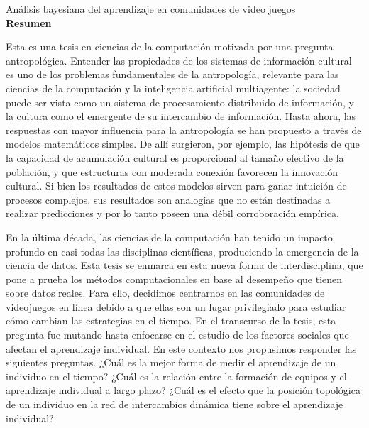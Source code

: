 \documentclass[a4paper,11pt]{book}
\theoremstyle{definition}
\newcommand{\TITULO}[0]{Análisis bayesiana del aprendizaje en comunidades de video juegos}
\begin{document}
\newpage

\begin{center}
\Large \TITULO \normalsize \\[0.5cm]

\textbf{Resumen}
\end{center}

\small

Esta es una tesis en ciencias de la computación motivada por una pregunta antropológica.
Entender las propiedades de los sistemas de información cultural es uno de los problemas fundamentales de la antropología, relevante para las ciencias de la computación y la inteligencia artificial multiagente: la sociedad puede ser vista como un sistema de procesamiento distribuido de información, y la cultura como el emergente de su intercambio de información.
Hasta ahora, las respuestas con mayor influencia para la antropología se han propuesto a través de modelos matemáticos simples.
De allí surgieron, por ejemplo, las hipótesis de que la capacidad de acumulación cultural es proporcional al tamaño efectivo de la población, y que estructuras con moderada conexión favorecen la innovación cultural.
Si bien los resultados de estos modelos sirven para ganar intuición de procesos complejos, sus resultados son analogías que no están destinadas a realizar predicciones y por lo tanto poseen una débil corroboración empírica.


En la última década, las ciencias de la computación han tenido un impacto profundo en casi todas las disciplinas científicas, produciendo la emergencia de la ciencia de datos.
Esta tesis se enmarca en esta nueva forma de interdisciplina, que pone a prueba los métodos computacionales en base al desempeño que tienen sobre datos reales.
Para ello, decidimos centrarnos en las comunidades de videojuegos en línea debido a que ellas son un lugar privilegiado para estudiar cómo cambian las estrategias en el tiempo.
En el transcurso de la tesis, esta pregunta fue mutando hasta enfocarse en el estudio de los factores sociales que afectan el aprendizaje individual.
En este contexto nos propusimos responder las siguientes preguntas.
¿Cuál es la mejor forma de medir el aprendizaje de un individuo en el tiempo?
¿Cuál es la relaci\'on entre la formación de equipos y el aprendizaje individual a largo plazo?
¿Cu\'al es el efecto que la posici\'on topol\'ogica de un individuo en la red de intercambios dinámica tiene sobre el aprendizaje individual?
\end{document}
